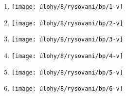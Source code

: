 \begin{enumerate}
    \item
    \begin{minipage}[t]{\linewidth}
        \begin{quote}
            \phantom{text}
        \end{quote}
        \centering
        \texttt{[image: úlohy/8/rysovani/bp/1-v]}

    \end{minipage}

    \item
    \begin{minipage}[t]{\linewidth}
        \begin{quote}
            \phantom{text}
        \end{quote}
        \centering
        \texttt{[image: úlohy/8/rysovani/bp/2-v]}

    \end{minipage}

    \item
    \begin{minipage}[t]{\linewidth}
        \begin{quote}
            \phantom{text}
        \end{quote}
        \centering
        \texttt{[image: úlohy/8/rysovani/bp/3-v]}

    \end{minipage}

    \item
    \begin{minipage}[t]{\linewidth}
        \begin{quote}
            \phantom{text}
        \end{quote}
        \centering
        \texttt{[image: úlohy/8/rysovani/bp/4-v]}

    \end{minipage}

    \item
    \begin{minipage}[t]{\linewidth}
        \begin{quote}
            \phantom{text}
        \end{quote}
        \centering
        \texttt{[image: úlohy/8/rysovani/bp/5-v]}

    \end{minipage}

    \item
    \begin{minipage}[t]{\linewidth}
        \begin{quote}
            \phantom{text}
        \end{quote}
        \centering
        \texttt{[image: úlohy/8/rysovani/bp/6-v]}


\end{minipage}
\end{enumerate}
